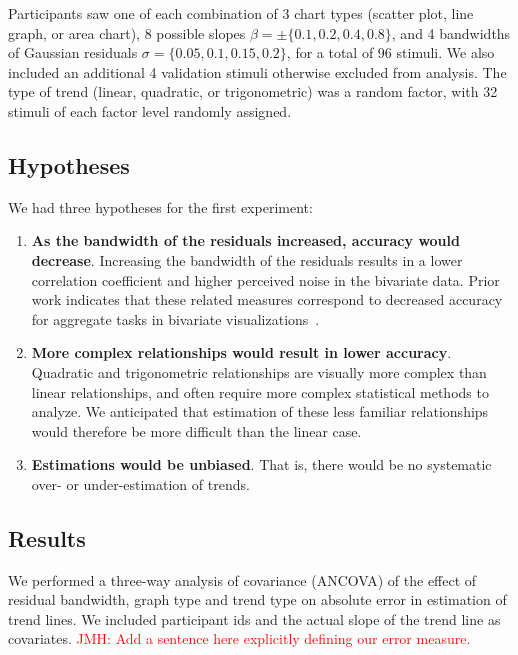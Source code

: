 \documentclass{sigchi}
\newcommand{\jeff}[1]{\textcolor{red}{JMH: #1}}
\begin{document}
Participants saw one of each combination of 3 chart types (scatter plot, line graph, or area chart), 8 possible slopes $\beta = \pm \{0.1,0.2,0.4,0.8\}$, and 4 bandwidths of Gaussian residuals $\sigma = \{0.05,0.1,0.15,0.2\}$, for a total of 96 stimuli. We also included an additional 4 validation stimuli otherwise excluded from analysis. The type of trend (linear, quadratic, or trigonometric) was a random factor, with 32 stimuli of each factor level randomly assigned.

\subsection{Hypotheses}

We had three hypotheses for the first experiment:
\begin{enumerate}
	\item \textbf{As the bandwidth of the residuals increased, accuracy would decrease}. Increasing the bandwidth of the residuals results in a lower correlation coefficient and higher perceived noise in the bivariate data. Prior work indicates that these related measures correspond to decreased accuracy for aggregate tasks in bivariate visualizations~\cite{albers2014task, harrison2014ranking}.
	\item \textbf{More complex relationships would result in lower accuracy}. Quadratic and trigonometric relationships are visually more complex than linear relationships, and often require more complex statistical methods to analyze. We anticipated that estimation of these less familiar relationships would therefore be more difficult than the linear case.
	\item \textbf{Estimations would be unbiased}. That is, there would be no systematic over- or under-estimation of trends.
\end{enumerate}

\subsection{Results}

\expOnesigmasFig

\expOnetypesFig

We performed a three-way analysis of covariance (ANCOVA) of the effect of residual bandwidth, graph type and trend type on absolute error in estimation of trend lines. We included participant ids and the actual slope of the trend line as covariates. \jeff{Add a sentence here explicitly defining our error measure.}
\end{document}
